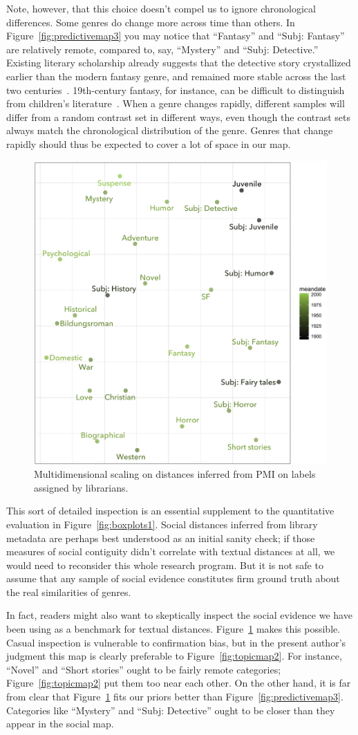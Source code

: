 \documentclass[11pt]{article}
\begin{document}
Note, however, that this choice doesn't compel us to ignore chronological differences. Some genres do change more across time than others. In Figure~\ref{fig:predictivemap3} you may notice that ``Fantasy'' and ``Subj: Fantasy'' are relatively remote, compared to, say, ``Mystery'' and ``Subj: Detective.'' Existing literary scholarship already suggests that the detective story crystallized earlier than the modern fantasy genre, and remained more stable across the last two centuries~\cite{rachman:poe}. 19th-century fantasy, for instance, can be difficult to distinguish from children's literature~\cite{levy:fantasy}. When a genre changes rapidly, different samples will differ from a random contrast set in different ways, even though the contrast sets always match the chronological distribution of the genre. Genres that change rapidly should thus be expected to cover a lot of space in our map.

\begin{figure}
  \centering
  \includegraphics[width=.47\textwidth]{socialmap.png}
  \caption{\label{fig:socialmap}Multidimensional scaling on distances inferred from PMI on labels assigned by librarians.}
\end{figure}

This sort of detailed inspection is an essential supplement to the quantitative evaluation in Figure~\ref{fig:boxplots1}. Social distances inferred from library metadata are perhaps best understood as an initial sanity check; if those measures of social contiguity didn't correlate with textual distances at all, we would need to reconsider this whole research program. But it is not safe to assume that any sample of social evidence constitutes firm ground truth about the real similarities of genres.

In fact, readers might also want to skeptically inspect the social evidence we have been using as a benchmark for textual distances. Figure~\ref{fig:socialmap} makes this possible. Casual inspection is vulnerable to confirmation bias, but in the present author's judgment this map is clearly preferable to Figure~\ref{fig:topicmap2}. For instance, ``Novel'' and ``Short stories'' ought to be fairly remote categories; Figure~\ref{fig:topicmap2} put them too near each other. On the other hand, it is far from clear that Figure~\ref{fig:socialmap} fits our priors better than Figure~\ref{fig:predictivemap3}. Categories like ``Mystery'' and ``Subj: Detective'' ought to be closer than they appear in the social map.
\end{document}

